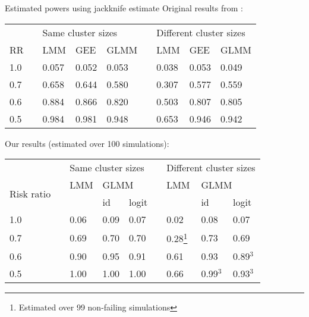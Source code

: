 \documentclass[9pt]{beamer}
\begin{document}
\begin{frame}{Estimated powers using jackknife estimate}
Original results from \citet{Hussey:2007}:
\begin{table}[h]
\small
\centering
\begin{tabular}{@{}lclllclll@{}}
\toprule
&& \multicolumn{3}{l}{Same cluster sizes} && \multicolumn{3}{l}{Different cluster sizes} \\
\cmidrule{3-5}\cmidrule{7-9}
RR & & LMM & {\color{lightgray}GEE} & GLMM && LMM & {\color{lightgray}GEE} & GLMM \\
\midrule
1.0 &&  0.057 & {\color{lightgray}0.052} & 0.053 && 0.038 & {\color{lightgray}0.053} & 0.049 \\
0.7 && 0.658 & {\color{lightgray}0.644} & 0.580 && 0.307 & {\color{lightgray}0.577} & 0.559 \\
0.6 && 0.884 & {\color{lightgray}0.866} & 0.820 && 0.503 & {\color{lightgray}0.807} & 0.805 \\
0.5 && 0.984 & {\color{lightgray}0.981} & 0.948 && 0.653 & {\color{lightgray}0.946} & 0.942 \\
\bottomrule
\end{tabular}
\end{table}
Our results (estimated over 100 simulations):
\begin{table}[h]
\small
\centering
\begin{tabular}{@{}lclllclll@{}}
\toprule
&& \multicolumn{3}{l}{Same cluster sizes} && \multicolumn{3}{l}{Different cluster sizes} \\
\cmidrule{3-5}\cmidrule{7-9}
\multirow{2}{*}{\parbox{0.75cm}{Risk ratio}} && LMM & \multicolumn{2}{l}{GLMM} && LMM & \multicolumn{2}{l}{GLMM} \\
\cmidrule{4-5}\cmidrule{8-9}
&& & id & logit && & id & logit \\
\midrule
1.0 && 0.06 & 0.09 & 0.07 && 0.02 & 0.08 & 0.07 \\
0.7 && 0.69 & 0.70 & 0.70 && 0.28\footnote{\label{fn1}Estimated over 99 non-failing simulations} & 0.73 & 0.69 \\
0.6 && 0.90 & 0.95 & 0.91 && 0.61 & 0.93 & 0.89$^{\text{3}}$ \\
0.5 && 1.00 & 1.00 & 1.00 && 0.66 & 0.99$^{\text{3}}$ & 0.93$^{\text{3}}$ \\
\bottomrule
\end{tabular}
\end{table}
\end{frame}
\end{document}
